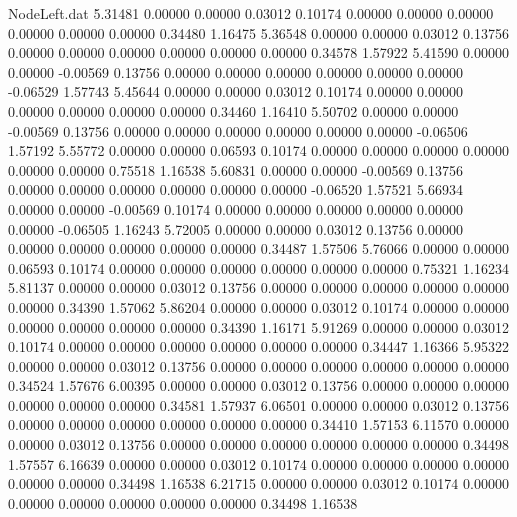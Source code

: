 \begin{filecontents}{NodeLeft.dat}
   5.31481    0.00000    0.00000     0.03012    0.10174    0.00000    0.00000    0.00000    0.00000    0.00000    0.00000    0.34480    1.16475
   5.36548    0.00000    0.00000     0.03012    0.13756    0.00000    0.00000    0.00000    0.00000    0.00000    0.00000    0.34578    1.57922
   5.41590    0.00000    0.00000    -0.00569    0.13756    0.00000    0.00000    0.00000    0.00000    0.00000    0.00000   -0.06529    1.57743
   5.45644    0.00000    0.00000     0.03012    0.10174    0.00000    0.00000    0.00000    0.00000    0.00000    0.00000    0.34460    1.16410
   5.50702    0.00000    0.00000    -0.00569    0.13756    0.00000    0.00000    0.00000    0.00000    0.00000    0.00000   -0.06506    1.57192
   5.55772    0.00000    0.00000     0.06593    0.10174    0.00000    0.00000    0.00000    0.00000    0.00000    0.00000    0.75518    1.16538
   5.60831    0.00000    0.00000    -0.00569    0.13756    0.00000    0.00000    0.00000    0.00000    0.00000    0.00000   -0.06520    1.57521
   5.66934    0.00000    0.00000    -0.00569    0.10174    0.00000    0.00000    0.00000    0.00000    0.00000    0.00000   -0.06505    1.16243
   5.72005    0.00000    0.00000     0.03012    0.13756    0.00000    0.00000    0.00000    0.00000    0.00000    0.00000    0.34487    1.57506
   5.76066    0.00000    0.00000     0.06593    0.10174    0.00000    0.00000    0.00000    0.00000    0.00000    0.00000    0.75321    1.16234
   5.81137    0.00000    0.00000     0.03012    0.13756    0.00000    0.00000    0.00000    0.00000    0.00000    0.00000    0.34390    1.57062
   5.86204    0.00000    0.00000     0.03012    0.10174    0.00000    0.00000    0.00000    0.00000    0.00000    0.00000    0.34390    1.16171
   5.91269    0.00000    0.00000     0.03012    0.10174    0.00000    0.00000    0.00000    0.00000    0.00000    0.00000    0.34447    1.16366
   5.95322    0.00000    0.00000     0.03012    0.13756    0.00000    0.00000    0.00000    0.00000    0.00000    0.00000    0.34524    1.57676
   6.00395    0.00000    0.00000     0.03012    0.13756    0.00000    0.00000    0.00000    0.00000    0.00000    0.00000    0.34581    1.57937
   6.06501    0.00000    0.00000     0.03012    0.13756    0.00000    0.00000    0.00000    0.00000    0.00000    0.00000    0.34410    1.57153
   6.11570    0.00000    0.00000     0.03012    0.13756    0.00000    0.00000    0.00000    0.00000    0.00000    0.00000    0.34498    1.57557
   6.16639    0.00000    0.00000     0.03012    0.10174    0.00000    0.00000    0.00000    0.00000    0.00000    0.00000    0.34498    1.16538
   6.21715    0.00000    0.00000     0.03012    0.10174    0.00000    0.00000    0.00000    0.00000    0.00000    0.00000    0.34498    1.16538

\end{filecontents}
